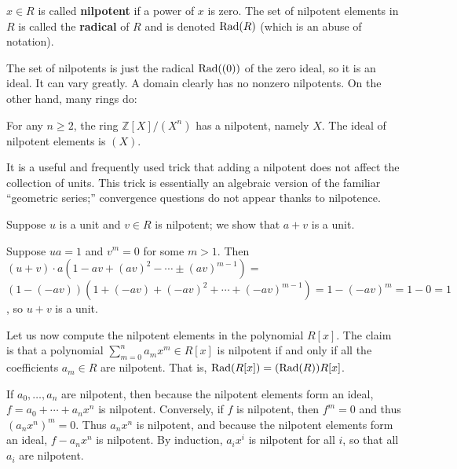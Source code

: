 \begin{definition} 
 $x \in R$ is called \textbf{nilpotent} if a power of $x$ is zero. The set of
 nilpotent elements in $R$ is called the \textbf{radical} of $R$ and is denoted
 $\operatorname{Rad}(R)$ (which is an abuse of notation).
\end{definition}

The set of nilpotents is just the radical $\operatorname{Rad}((0))$ of the zero ideal, so it
is an ideal. It can vary greatly. 
A domain clearly has no nonzero nilpotents. On the other hand, many rings do:

\begin{example} 
For any $n \geq 2$, the ring $\mathbb{Z}[X]/(X^n)$ has a nilpotent, namely $X$.
The ideal of nilpotent elements is $(X)$.
\end{example} 

It is a useful and frequently used trick that adding a nilpotent does not affect
the collection of units. This trick is essentially an algebraic version of the
familiar ``geometric series;'' convergence questions do not appear thanks to
nilpotence. 

\begin{example} 
Suppose $u$ is a unit and $v \in R$ is nilpotent; we show that $a+v$ is a unit.

Suppose $ua=1$ and $v^m=0$ for some
$m>1$. Then  $(u+v)\cdot a(1-av+(av)^2-\cdots\pm(av)^{m-1})=$
$(1-(-av))(1+(-av)+(-av)^2+\cdots+(-av)^{m-1})=1-(-av)^m=1-0=1$, so $u+v$
is a unit.
\end{example} 

\begin{example}
Let us now compute the nilpotent elements in the polynomial $R[x]$.
The claim is that a polynomial $\sum_{m=0}^n a_m x^m \in R[x]$ is nilpotent if and only
if all the coefficients $a_m \in R$ are nilpotent. That is, $\operatorname{Rad}(R[x]) =
(\operatorname{Rad}(R))R[x]$.

If $a_0,\ldots,a_n$ are nilpotent, then because the nilpotent
elements form an ideal, $f=a_0+\cdots+a_nx^n$ is nilpotent. Conversely,
if $f$ is nilpotent, then $f^m=0$ and thus $(a_nx^n)^m=0$. Thus $a_nx^n$
is nilpotent, and because the nilpotent elements form an ideal, $f-a_nx^n$
is nilpotent. By induction, $a_ix^i$ is nilpotent for all $i$, so that all
$a_i$ are nilpotent.
\end{example} 


